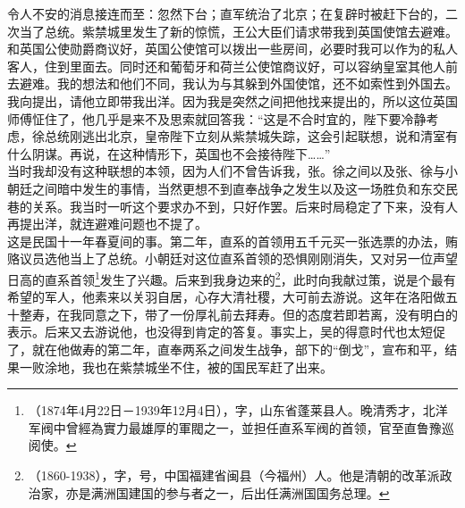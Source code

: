 令人不安的消息接连而至：忽然下台；直军统治了北京；在复辟时被赶下台的，二次当了总统。紫禁城里发生了新的惊慌，王公大臣们请求带我到英国使馆去避难。和英国公使勋爵商议好，英国公使馆可以拨出一些房间，必要时我可以作为的私人客人，住到里面去。同时还和葡萄牙和荷兰公使馆商议好，可以容纳皇室其他人前去避难。我的想法和他们不同，我认为与其躲到外国使馆，还不如索性到外国去。我向提出，请他立即带我出洋。因为我是突然之间把他找来提出的，所以这位英国师傅怔住了，他几乎是来不及思索就回答我：“这是不合时宜的，陛下要冷静考虑，徐总统刚逃出北京，皇帝陛下立刻从紫禁城失踪，这会引起联想，说和清室有什么阴谋。再说，在这种情形下，英国也不会接待陛下……”\\

当时我却没有这种联想的本领，因为人们不曾告诉我，张。徐之间以及张、徐与小朝廷之间暗中发生的事情，当然更想不到直奉战争之发生以及这一场胜负和东交民巷的关系。我当时一听这个要求办不到，只好作罢。后来时局稳定了下来，没有人再提出洋，就连避难问题也不提了。\\

这是民国十一年春夏间的事。第二年，直系的首领用五千元买一张选票的办法，贿赂议员选他当上了总统。小朝廷对这位直系首领的恐惧刚刚消失，又对另一位声望日高的直系首领\footnote{（1874年4月22日－1939年12月4日），字，山东省蓬莱县人。晚清秀才，北洋军阀中曾經為實力最雄厚的軍閥之一，並担任直系军阀的首领，官至直鲁豫巡阅使。}发生了兴趣。后来到我身边来的\footnote{（1860-1938），字，号，中国福建省闽县（今福州）人。他是清朝的改革派政治家，亦是满洲国建国的参与者之一，后出任满洲国国务总理。}，此时向我献过策，说是个最有希望的军人，他素来以关羽自居，心存大清社稷，大可前去游说。这年在洛阳做五十整寿，在我同意之下，带了一份厚礼前去拜寿。但的态度若即若离，没有明白的表示。后来又去游说他，也没得到肯定的答复。事实上，吴的得意时代也太短促了，就在他做寿的第二年，直奉两系之间发生战争，部下的“倒戈”，宣布和平，结果一败涂地，我也在紫禁城坐不住，被的国民军赶了出来。\\

